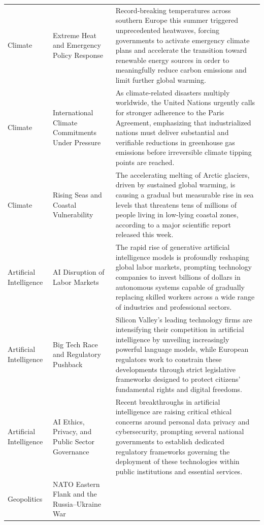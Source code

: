 \documentclass[
  journal=medium,
  manuscript=article-type,
  year=2025,
  volume=1,
]{cup-journal}
\begin{document}
\begin{longtable}{p{2cm}p{4cm}p{7cm}}
Climate
  & Extreme Heat and Emergency Policy Response
  & Record-breaking temperatures across southern Europe this summer triggered
    unprecedented heatwaves, forcing governments to activate emergency climate plans
    and accelerate the transition toward renewable energy sources in order to
    meaningfully reduce carbon emissions and limit further global warming. \\
Climate
  & International Climate Commitments Under Pressure
  & As climate-related disasters multiply worldwide, the United Nations urgently calls
    for stronger adherence to the Paris Agreement, emphasizing that industrialized
    nations must deliver substantial and verifiable reductions in greenhouse gas
    emissions before irreversible climate tipping points are reached. \\
Climate
  & Rising Seas and Coastal Vulnerability
  & The accelerating melting of Arctic glaciers, driven by sustained global warming,
    is causing a gradual but measurable rise in sea levels that threatens tens of
    millions of people living in low-lying coastal zones, according to a major
    scientific report released this week. \\
\addlinespace
Artificial Intelligence
  & AI Disruption of Labor Markets
  & The rapid rise of generative artificial intelligence models is profoundly reshaping
    global labor markets, prompting technology companies to invest billions of dollars
    in autonomous systems capable of gradually replacing skilled workers across a wide
    range of industries and professional sectors. \\
Artificial Intelligence
  & Big Tech Race and Regulatory Pushback
  & Silicon Valley's leading technology firms are intensifying their competition in
    artificial intelligence by unveiling increasingly powerful language models, while
    European regulators work to constrain these developments through strict legislative
    frameworks designed to protect citizens' fundamental rights and digital freedoms. \\
Artificial Intelligence
  & AI Ethics, Privacy, and Public Sector Governance
  & Recent breakthroughs in artificial intelligence are raising critical ethical
    concerns around personal data privacy and cybersecurity, prompting several national
    governments to establish dedicated regulatory frameworks governing the deployment
    of these technologies within public institutions and essential services. \\
\addlinespace
Geopolitics
  & NATO Eastern Flank and the Russia--Ukraine War

\end{longtable}
\end{document}
